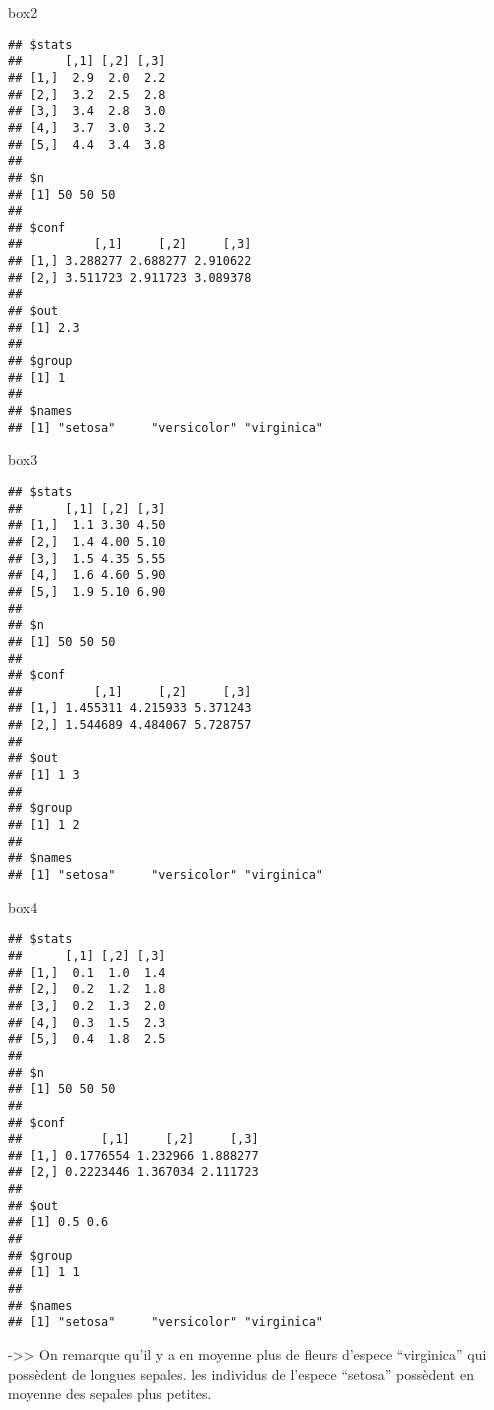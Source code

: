 \documentclass[]{article}
\newenvironment{Shaded}{\begin{snugshade}}{\end{snugshade}}
\newcommand{\NormalTok}[1]{#1}
\begin{document}
\begin{Shaded}
\begin{Highlighting}[]
\NormalTok{box2}
\end{Highlighting}
\end{Shaded}

\begin{verbatim}
## $stats
##      [,1] [,2] [,3]
## [1,]  2.9  2.0  2.2
## [2,]  3.2  2.5  2.8
## [3,]  3.4  2.8  3.0
## [4,]  3.7  3.0  3.2
## [5,]  4.4  3.4  3.8
## 
## $n
## [1] 50 50 50
## 
## $conf
##          [,1]     [,2]     [,3]
## [1,] 3.288277 2.688277 2.910622
## [2,] 3.511723 2.911723 3.089378
## 
## $out
## [1] 2.3
## 
## $group
## [1] 1
## 
## $names
## [1] "setosa"     "versicolor" "virginica"
\end{verbatim}

\begin{Shaded}
\begin{Highlighting}[]
\NormalTok{box3}
\end{Highlighting}
\end{Shaded}

\begin{verbatim}
## $stats
##      [,1] [,2] [,3]
## [1,]  1.1 3.30 4.50
## [2,]  1.4 4.00 5.10
## [3,]  1.5 4.35 5.55
## [4,]  1.6 4.60 5.90
## [5,]  1.9 5.10 6.90
## 
## $n
## [1] 50 50 50
## 
## $conf
##          [,1]     [,2]     [,3]
## [1,] 1.455311 4.215933 5.371243
## [2,] 1.544689 4.484067 5.728757
## 
## $out
## [1] 1 3
## 
## $group
## [1] 1 2
## 
## $names
## [1] "setosa"     "versicolor" "virginica"
\end{verbatim}

\begin{Shaded}
\begin{Highlighting}[]
\NormalTok{box4}
\end{Highlighting}
\end{Shaded}

\begin{verbatim}
## $stats
##      [,1] [,2] [,3]
## [1,]  0.1  1.0  1.4
## [2,]  0.2  1.2  1.8
## [3,]  0.2  1.3  2.0
## [4,]  0.3  1.5  2.3
## [5,]  0.4  1.8  2.5
## 
## $n
## [1] 50 50 50
## 
## $conf
##           [,1]     [,2]     [,3]
## [1,] 0.1776554 1.232966 1.888277
## [2,] 0.2223446 1.367034 2.111723
## 
## $out
## [1] 0.5 0.6
## 
## $group
## [1] 1 1
## 
## $names
## [1] "setosa"     "versicolor" "virginica"
\end{verbatim}

-\textgreater{}\textgreater{} On remarque qu'il y a en moyenne plus de
fleurs d'espece ``virginica'' qui possèdent de longues sepales. les
individus de l'espece ``setosa'' possèdent en moyenne des sepales plus
petites.
\end{document}
